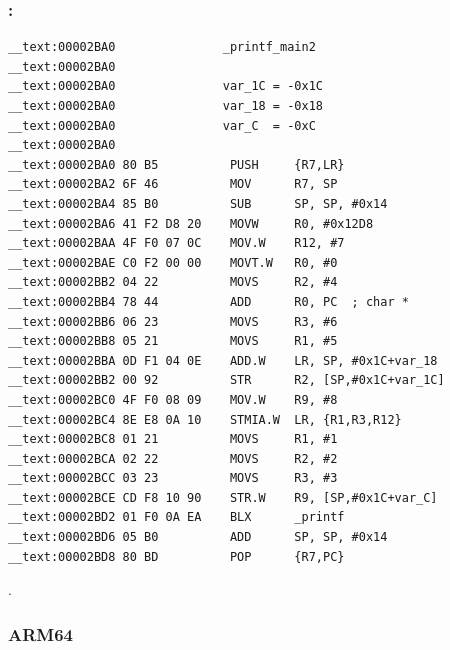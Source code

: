 \subsubsection{\OptimizingXcodeIV: \ThumbTwoMode}

\begin{lstlisting}
__text:00002BA0               _printf_main2
__text:00002BA0
__text:00002BA0               var_1C = -0x1C
__text:00002BA0               var_18 = -0x18
__text:00002BA0               var_C  = -0xC
__text:00002BA0
__text:00002BA0 80 B5          PUSH     {R7,LR}
__text:00002BA2 6F 46          MOV      R7, SP
__text:00002BA4 85 B0          SUB      SP, SP, #0x14
__text:00002BA6 41 F2 D8 20    MOVW     R0, #0x12D8
__text:00002BAA 4F F0 07 0C    MOV.W    R12, #7
__text:00002BAE C0 F2 00 00    MOVT.W   R0, #0
__text:00002BB2 04 22          MOVS     R2, #4
__text:00002BB4 78 44          ADD      R0, PC  ; char *
__text:00002BB6 06 23          MOVS     R3, #6
__text:00002BB8 05 21          MOVS     R1, #5
__text:00002BBA 0D F1 04 0E    ADD.W    LR, SP, #0x1C+var_18
__text:00002BB2 00 92          STR      R2, [SP,#0x1C+var_1C]
__text:00002BC0 4F F0 08 09    MOV.W    R9, #8
__text:00002BC4 8E E8 0A 10    STMIA.W  LR, {R1,R3,R12}
__text:00002BC8 01 21          MOVS     R1, #1
__text:00002BCA 02 22          MOVS     R2, #2
__text:00002BCC 03 23          MOVS     R3, #3
__text:00002BCE CD F8 10 90    STR.W    R9, [SP,#0x1C+var_C]
__text:00002BD2 01 F0 0A EA    BLX      _printf
__text:00002BD6 05 B0          ADD      SP, SP, #0x14
__text:00002BD8 80 BD          POP      {R7,PC}
\end{lstlisting}

%
%
.

\subsubsection{ARM64}




